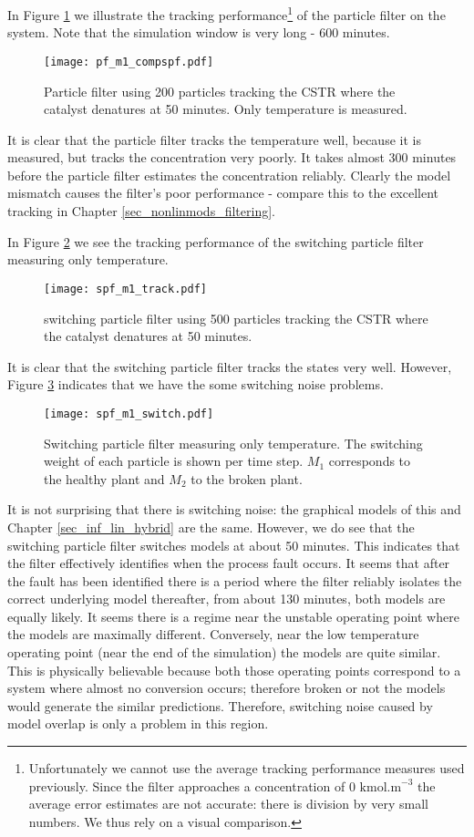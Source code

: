 In Figure \ref{fig_pf_m1_compspf} we illustrate the tracking performance\footnote{Unfortunately we cannot use the average tracking performance measures used previously. Since the filter approaches a concentration of 0 $\text{kmol.m}^{-3}$ the average error estimates are not accurate: there is division by very small numbers. We thus rely on a visual comparison.} of the particle filter on the system. Note that the simulation window is very long - 600 minutes.
\begin{figure}[H] 
\centering
\texttt{[image: pf\_m1\_compspf.pdf]}
\caption{Particle filter using 200 particles tracking the CSTR where the catalyst denatures at 50 minutes. Only temperature is measured.}
\label{fig_pf_m1_compspf}
\end{figure}
It is clear that the particle filter tracks the temperature well, because it is measured, but tracks the concentration very poorly. It takes almost 300 minutes before the particle filter estimates the concentration reliably. Clearly the model mismatch causes the filter's poor performance - compare this to the excellent tracking in Chapter \ref{sec_nonlinmods_filtering}.

In Figure \ref{fig_spf_m1_track} we see the tracking performance of the switching particle filter measuring only temperature.
\begin{figure}[H] 
\centering
\texttt{[image: spf\_m1\_track.pdf]}
\caption{switching particle filter using 500 particles tracking the CSTR where the catalyst denatures at 50 minutes.}
\label{fig_spf_m1_track}
\end{figure}
It is clear that the switching particle filter tracks the states very well. However, Figure \ref{fig_spf_m1_switch} indicates that we have the some switching noise problems.
\begin{figure}[H] 
\centering
\texttt{[image: spf\_m1\_switch.pdf]}
\caption{Switching particle filter measuring only temperature. The switching weight of each particle is shown per time step. $M_1$ corresponds to the healthy plant and $M_2$ to the broken plant.}
\label{fig_spf_m1_switch}
\end{figure} 
It is not surprising that there is switching noise: the graphical models of this and Chapter \ref{sec_inf_lin_hybrid} are the same. However, we do see that the switching particle filter switches models at about 50 minutes. This indicates that the filter effectively identifies when the process fault occurs. It seems that after the fault has been identified there is a period where the filter reliably isolates the correct underlying model thereafter, from about 130 minutes, both models are equally likely. It seems there is a regime near the unstable operating point where the models are maximally different. Conversely, near the low temperature operating point (near the end of the simulation) the models are quite similar. This is physically believable because both those operating points correspond to a system where almost no conversion occurs; therefore broken or not the models would generate the similar predictions. Therefore, switching noise caused by model overlap is only a problem in this region.

